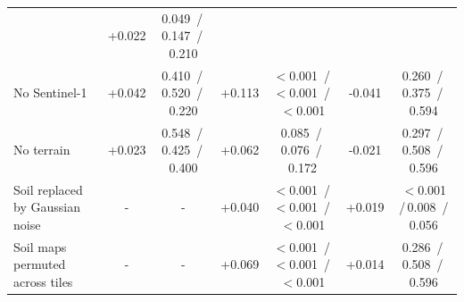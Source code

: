 \begin{tabular}{lcccccc}
& +0.022%
& 0.049%
\,/\,0.147%
\,/\,0.210%
\\
No Sentinel-1
& +0.042%
& 0.410%
\,/\,0.520%
\,/\,0.220%
& +0.113%
& $<$0.001%
\,/\,$<$0.001%
\,/\,$<$0.001%
& -0.041%
& 0.260%
\,/\,0.375%
\,/\,0.594%
\\
No terrain
& +0.023%
& 0.548%
\,/\,0.425%
\,/\,0.400%
& +0.062%
& 0.085%
\,/\,0.076%
\,/\,0.172%
& -0.021%
& 0.297%
\,/\,0.508%
\,/\,0.596%
\\
\midrule
Soil replaced by Gaussian noise
& -
& -
& +0.040%
& $<$0.001%
\,/\,$<$0.001%
\,/\,$<$0.001%
& +0.019%
& $<$0.001%
\,/\,0.008%
\,/\,0.056%
\\
Soil maps permuted across tiles
& -
& -
& +0.069%
& $<$0.001%
\,/\,$<$0.001%
\,/\,$<$0.001%
& +0.014%
& 0.286%
\,/\,0.508%
\,/\,0.596%
\\
\bottomrule
\end{tabular}
